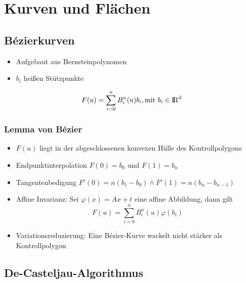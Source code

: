 \documentclass[10pt,a4paper]{article}
\def\realnumbers{{\rm I\!R}}
\begin{document}
        \newpage
        \section{Kurven und Flächen}
        \label{kuf:sec:kurven_und_flaechen}
        
        \subsection{Bézierkurven}
        \label{kuf:sub:bezierkurven}
        \begin{itemize}
        	\item Aufgebaut aus Bernsteinpolynomen
        	\item $b_i$ heißen Stützpunkte
        \end{itemize}
        \vspace*{-0.5cm}
        $$F(u) = \sum_{i=0}^n B_i^n(u)b_i, \text{mit } b_i \in \realnumbers^d$$ 

        \subsubsection{Lemma von Bézier}
        \label{kuf:sub:lemma_von_bezier}
        
        \begin{itemize} 
        	\item $F(u)$ liegt in der abgeschlossenen konvexen Hülle des Kontrollpolygons
        	\item Endpunktinterpolation $F(0) = b_0$ und $F(1) = b_n$
        	\item Tangentenbedigung $F'(0) = n(b_1 - b_0) \land F'(1) = n(b_n - b_{n-1})$
        	\item Affine Invarianz: Sei $\varphi(x) = Ax + t$ eine affine Abbildung, dann gilt
          $$F(u) = \sum^n_{i=0} B_i^n(u) \varphi(b_i)$$
        	\item Variationsreduzierung: Eine Bézier-Kurve wackelt nicht stärker als Kontrollpolygon
        \end{itemize}
      
        \subsection{De-Casteljau-Algorithmus}
        \label{kuf:sub:de_casteljau-algorithmus}
        
\end{document}
